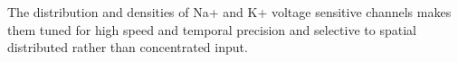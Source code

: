 The distribution and densities of Na+ and K+ voltage sensitive channels makes them tuned for high speed and temporal precision and selective to spatial distributed rather than concentrated input.

\citep{Hofer:2011, Packer:2011}

